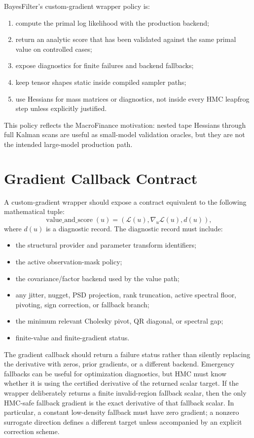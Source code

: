 BayesFilter's custom-gradient wrapper policy is:
\begin{enumerate}[label=(\roman*)]
  \item compute the primal log likelihood with the production backend;
  \item return an analytic score that has been validated against the same
    primal value on controlled cases;
  \item expose diagnostics for finite failures and backend fallbacks;
  \item keep tensor shapes static inside compiled sampler paths;
  \item use Hessians for mass matrices or diagnostics, not inside every HMC
    leapfrog step unless explicitly justified.
\end{enumerate}

This policy reflects the MacroFinance motivation: nested tape Hessians through
full Kalman scans are useful as small-model validation oracles, but they are not
the intended large-model production path.

\section{Gradient Callback Contract}
\label{sec:bf-custom-gradient-callback}

A custom-gradient wrapper should expose a contract equivalent to the following
mathematical tuple:
\[
  \operatorname{value\_and\_score}(u)
  =
  \left(
    \mathcal{L}(u),
    \nabla_u\mathcal{L}(u),
    d(u)
  \right),
\]
where $d(u)$ is a diagnostic record.  The diagnostic record must include:
\begin{itemize}
  \item the structural provider and parameter transform identifiers;
  \item the active observation-mask policy;
  \item the covariance/factor backend used by the value path;
  \item any jitter, nugget, PSD projection, rank truncation, active spectral
    floor, pivoting, sign correction, or fallback branch;
  \item the minimum relevant Cholesky pivot, QR diagonal, or spectral gap;
  \item finite-value and finite-gradient status.
\end{itemize}
The gradient callback should return a failure status rather than silently
replacing the derivative with zeros, prior gradients, or a different backend.
Emergency fallbacks can be useful for optimization diagnostics, but HMC must
know whether it is using the certified derivative of the returned scalar target.
If the wrapper deliberately returns a finite invalid-region fallback scalar, then
the only HMC-safe fallback gradient is the exact derivative of that fallback
scalar.  In particular, a constant low-density fallback must have zero gradient;
a nonzero surrogate direction defines a different target unless accompanied by an
explicit correction scheme.

